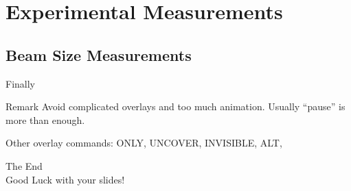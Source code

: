 \documentclass[professionalfonts,t]{beamer}
\begin{document}
\section{Experimental Measurements}
\subsection{Beam Size Measurements}
\begin{frame}{Finally}
\begin{block}{Remark}
Avoid complicated overlays and too much animation. Usually ``pause'' is more than enough.
\end{block}
\bigskip
Other overlay commands: ONLY, UNCOVER, INVISIBLE, ALT,

\pause
\begin{center}
\bigskip
{\Large  The End \\[.5cm] Good Luck with your slides!}
\end{center}
\end{frame}
\end{document}

